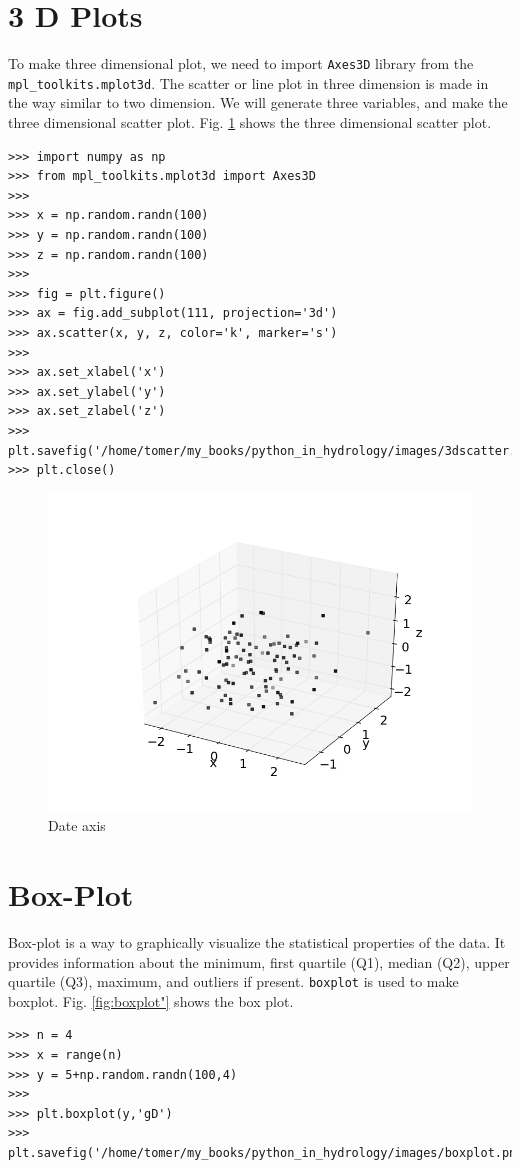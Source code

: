 \documentclass[10pt]{book}
\begin{document}
\section{3 D Plots}
To make three dimensional plot, we need to import \verb"Axes3D" library from the \verb"mpl_toolkits.mplot3d". The scatter or line plot in three dimension is made in the way similar to two dimension. We will generate three variables, and make the three dimensional scatter plot. Fig. \ref{fig:3dscatter} shows the three dimensional scatter plot. 
\beforeverb \begin{verbatim}
>>> import numpy as np
>>> from mpl_toolkits.mplot3d import Axes3D
>>> 
>>> x = np.random.randn(100)
>>> y = np.random.randn(100)
>>> z = np.random.randn(100)
>>> 
>>> fig = plt.figure()
>>> ax = fig.add_subplot(111, projection='3d')
>>> ax.scatter(x, y, z, color='k', marker='s')
>>> 
>>> ax.set_xlabel('x')
>>> ax.set_ylabel('y')
>>> ax.set_zlabel('z')
>>> plt.savefig('/home/tomer/my_books/python_in_hydrology/images/3dscatter.png')
>>> plt.close()
\end{verbatim} \afterverb
{}

\beforefig
\begin{figure}[h!]
  \centering
    \includegraphics[scale=0.5]{images/3dscatter.png}
  \caption{Date axis}
   \label{fig:3dscatter}
\end{figure}
\afterfig

\section{Box-Plot}
Box-plot is a way to graphically visualize the statistical properties of the data. It provides information about the minimum, first quartile (Q1), median (Q2), upper quartile (Q3), maximum, and outliers if present. \verb"boxplot" is used to make boxplot. Fig. \ref{fig:boxplot"} shows the box plot. 
\beforeverb \begin{verbatim}
>>> n = 4
>>> x = range(n)
>>> y = 5+np.random.randn(100,4)
>>> 
>>> plt.boxplot(y,'gD')
>>> plt.savefig('/home/tomer/my_books/python_in_hydrology/images/boxplot.png')
\end{verbatim} \afterverb
\end{document}
